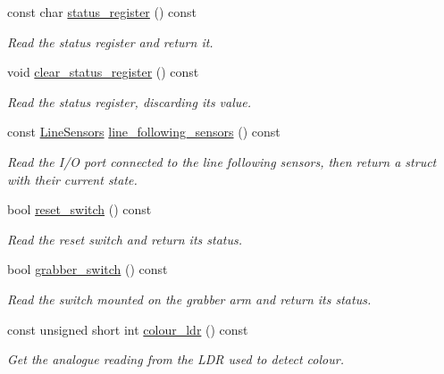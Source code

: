 \begin{DoxyCompactItemize}
const char \hyperlink{classIDP_1_1HardwareAbstractionLayer_a466af55473ec6b65d1f5069cfc88e774}{status\_\-register} () const 
\begin{DoxyCompactList}\small\item\em Read the status register and return it. \item\end{DoxyCompactList}\item 
void \hyperlink{classIDP_1_1HardwareAbstractionLayer_a1902d9260758777966ab362e21f3be42}{clear\_\-status\_\-register} () const 
\begin{DoxyCompactList}\small\item\em Read the status register, discarding its value. \item\end{DoxyCompactList}\item 
const \hyperlink{structIDP_1_1LineSensors}{LineSensors} \hyperlink{classIDP_1_1HardwareAbstractionLayer_aca143d627de2ff9942069ad922d17ee5}{line\_\-following\_\-sensors} () const 
\begin{DoxyCompactList}\small\item\em Read the I/O port connected to the line following sensors, then return a struct with their current state. \item\end{DoxyCompactList}\item 
bool \hyperlink{classIDP_1_1HardwareAbstractionLayer_a4ce4bec948d6449e7cab3cfcd0de513f}{reset\_\-switch} () const 
\begin{DoxyCompactList}\small\item\em Read the reset switch and return its status. \item\end{DoxyCompactList}\item 
bool \hyperlink{classIDP_1_1HardwareAbstractionLayer_a82ef6744041c174edb7f8982f44685b7}{grabber\_\-switch} () const 
\begin{DoxyCompactList}\small\item\em Read the switch mounted on the grabber arm and return its status. \item\end{DoxyCompactList}\item 
const unsigned short int \hyperlink{classIDP_1_1HardwareAbstractionLayer_a0bc4534c003bb3cb91bd9b42e80ea8a7}{colour\_\-ldr} () const 
\begin{DoxyCompactList}\small\item\em Get the analogue reading from the LDR used to detect colour. \item\end{DoxyCompactList}\item 

\end{DoxyCompactItemize}
